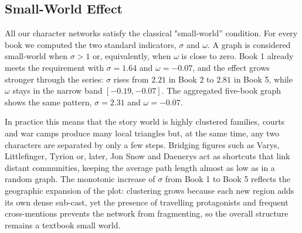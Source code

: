 \documentclass[12pt, a4paper]{article}
\begin{document}
\subsection*{Small-World Effect} 

All our character networks satisfy the classical "small-world'' condition.
For every book we computed the two standard indicators, 
$\sigma$ and $\omega$.
A graph is considered small-world when $\sigma>1$ or, equivalently, when $\omega$ is close to zero.
Book 1 already meets the requirement with $\sigma=1.64$ and $\omega=-0.07$, and the effect grows stronger through the series: $\sigma$ rises from $2.21$ in Book 2 to $2.81$ in Book 5, while $\omega$ stays in the narrow band $[-0.19,-0.07]$.
The aggregated five-book graph shows the same pattern, $\sigma=2.31$ and $\omega=-0.07$.

In practice this means that the story world is highly clustered families, 
courts and war camps produce many local triangles but, at the same time, 
any two characters are separated by only a few steps. 
Bridging figures such as Varys, Littlefinger, 
Tyrion or, later, Jon Snow and Daenerys act as 
shortcuts that link distant communities, keeping the average path length almost as low 
as in a random graph.  The monotonic increase of $\sigma$ from Book 1 to Book 5 reflects
 the geographic expansion of the plot: clustering grows because each new region adds its
  own dense sub-cast, yet the presence of travelling protagonists and frequent cross-mentions
   prevents the network from fragmenting, so the overall structure remains a textbook small world.
\end{document}
